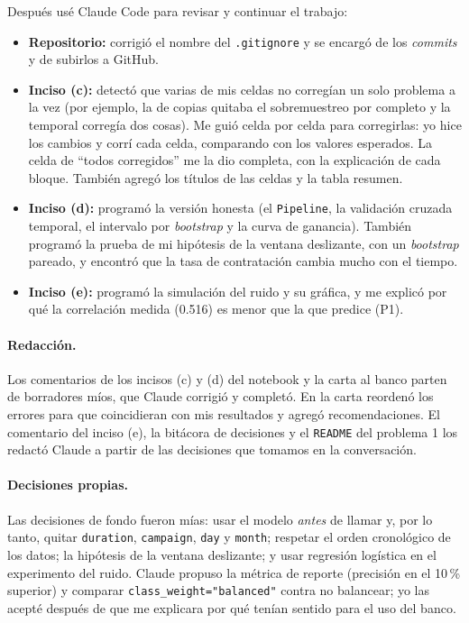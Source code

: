 \documentclass[11pt, letterpaper]{article}
\begin{document}
Después usé Claude Code para revisar y continuar el trabajo:
\begin{itemize}
    \item \textbf{Repositorio:} corrigió el nombre del \texttt{.gitignore} y se encargó de los \emph{commits} y de subirlos a GitHub.
    \item \textbf{Inciso (c):} detectó que varias de mis celdas no corregían un solo problema a la vez (por ejemplo, la de copias quitaba el sobremuestreo por completo y la temporal corregía dos cosas). Me guió celda por celda para corregirlas: yo hice los cambios y corrí cada celda, comparando con los valores esperados. La celda de ``todos corregidos'' me la dio completa, con la explicación de cada bloque. También agregó los títulos de las celdas y la tabla resumen.
    \item \textbf{Inciso (d):} programó la versión honesta (el \texttt{Pipeline}, la validación cruzada temporal, el intervalo por \emph{bootstrap} y la curva de ganancia). También programó la prueba de mi hipótesis de la ventana deslizante, con un \emph{bootstrap} pareado, y encontró que la tasa de contratación cambia mucho con el tiempo.
    \item \textbf{Inciso (e):} programó la simulación del ruido y su gráfica, y me explicó por qué la correlación medida (0.516) es menor que la que predice (P1).
\end{itemize}

\paragraph{Redacción.} Los comentarios de los incisos (c) y (d) del notebook y la carta al banco parten de borradores míos, que Claude corrigió y completó. En la carta reordenó los errores para que coincidieran con mis resultados y agregó recomendaciones. El comentario del inciso (e), la bitácora de decisiones y el \texttt{README} del problema 1 los redactó Claude a partir de las decisiones que tomamos en la conversación.

\paragraph{Decisiones propias.} Las decisiones de fondo fueron mías: usar el modelo \emph{antes} de llamar y, por lo tanto, quitar \texttt{duration}, \texttt{campaign}, \texttt{day} y \texttt{month}; respetar el orden cronológico de los datos; la hipótesis de la ventana deslizante; y usar regresión logística en el experimento del ruido. Claude propuso la métrica de reporte (precisión en el 10\,\% superior) y comparar \texttt{class\_weight="balanced"} contra no balancear; yo las acepté después de que me explicara por qué tenían sentido para el uso del banco.
\end{document}
